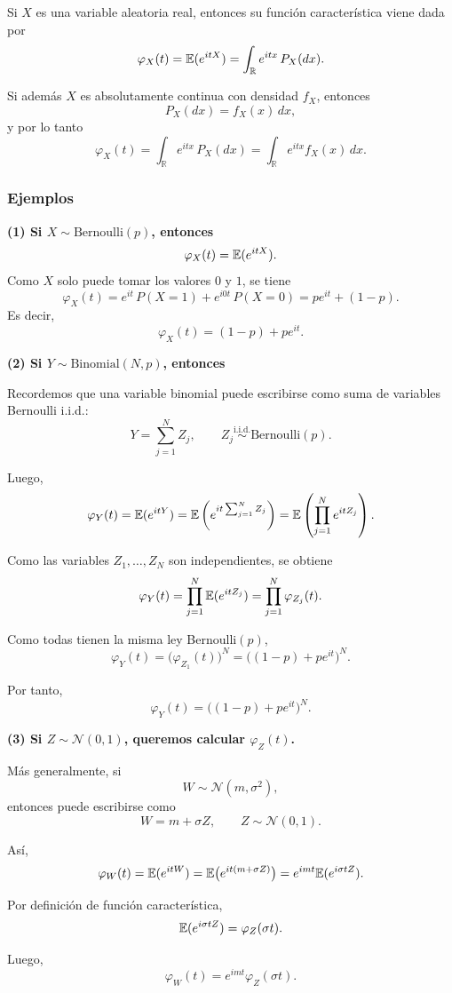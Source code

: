 Si $X$ es una variable aleatoria real, entonces su función característica viene dada por
\[
\varphi_X(t)=\mathbb{E}(e^{itX})=\int_{\mathbb{R}} e^{itx}\,P_X(dx).
\]

Si además $X$ es absolutamente continua con densidad $f_X$, entonces
\[
P_X(dx)=f_X(x)\,dx,
\]
y por lo tanto
\[
\varphi_X(t)
=
\int_{\mathbb{R}} e^{itx}\,P_X(dx)
=
\int_{\mathbb{R}} e^{itx}f_X(x)\,dx.
\]

\subsubsection*{Ejemplos}

\textbf{(1) Si $X\sim \mathrm{Bernoulli}(p)$, entonces}
\[
\varphi_X(t)=\mathbb{E}(e^{itX}).
\]
Como $X$ solo puede tomar los valores $0$ y $1$, se tiene
\[
\varphi_X(t)
=
e^{it}\,P(X=1)+e^{i0t}\,P(X=0)
=
pe^{it}+(1-p).
\]
Es decir,
\[
\varphi_X(t)=(1-p)+pe^{it}.
\]

\medskip

\textbf{(2) Si $Y\sim \mathrm{Binomial}(N,p)$, entonces}

Recordemos que una variable binomial puede escribirse como suma de variables Bernoulli i.i.d.:
\[
Y=\sum_{j=1}^{N} Z_j,
\qquad Z_j \stackrel{\mathrm{i.i.d.}}{\sim} \mathrm{Bernoulli}(p).
\]

Luego,
\[
\varphi_Y(t)=\mathbb{E}(e^{itY})
=
\mathbb{E}\left(e^{it\sum_{j=1}^{N} Z_j}\right)
=
\mathbb{E}\left(\prod_{j=1}^{N} e^{itZ_j}\right).
\]

Como las variables $Z_1,\dots,Z_N$ son independientes, se obtiene
\[
\varphi_Y(t)
=
\prod_{j=1}^{N}\mathbb{E}(e^{itZ_j})
=
\prod_{j=1}^{N}\varphi_{Z_j}(t).
\]

Como todas tienen la misma ley Bernoulli$(p)$,
\[
\varphi_Y(t)=\big(\varphi_{Z_1}(t)\big)^N
=
\big((1-p)+pe^{it}\big)^N.
\]

Por tanto,
\[
\varphi_Y(t)=\big((1-p)+pe^{it}\big)^N.
\]

\medskip

\textbf{(3) Si $Z\sim \mathcal{N}(0,1)$, queremos calcular $\varphi_Z(t)$.}

Más generalmente, si
\[
W\sim \mathcal{N}(m,\sigma^2),
\]
entonces puede escribirse como
\[
W=m+\sigma Z,
\qquad Z\sim \mathcal{N}(0,1).
\]

Así,
\[
\varphi_W(t)=\mathbb{E}(e^{itW})
=
\mathbb{E}\big(e^{it(m+\sigma Z)}\big)
=
e^{imt}\mathbb{E}(e^{i\sigma t Z}).
\]

Por definición de función característica,
\[
\mathbb{E}(e^{i\sigma t Z})=\varphi_Z(\sigma t).
\]

Luego,
\[
\varphi_W(t)=e^{imt}\varphi_Z(\sigma t).
\]


